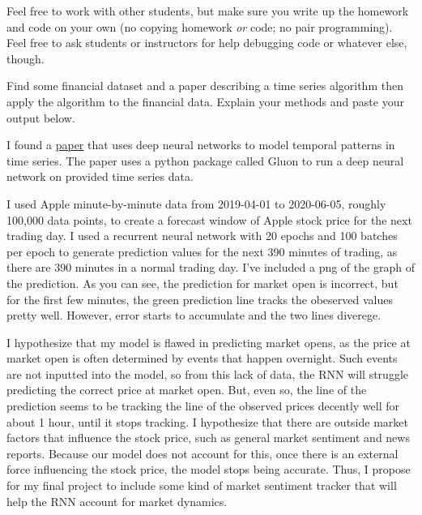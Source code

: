 \documentclass[12pt,letterpaper]{pset}
\begin{document}
Feel free to work with other students, but make sure you write up the homework
and code on your own (no copying homework \textit{or} code; no pair programming).
Feel free to ask students or instructors for help debugging code or whatever else,
though.\\

\begin{problem}[1]
  Find some financial dataset and a paper describing a time series algorithm
  then apply the algorithm to the financial data. Explain your methods and
  paste your output below.
\end{problem}

\begin{solution}
    I found a \href{https://arxiv.org/abs/1703.07015} {paper} that uses deep neural networks to model temporal patterns in time series. The paper uses a python package called Gluon to run a deep neural network on provided time series data.
    
    I used Apple minute-by-minute data from 2019-04-01 to 2020-06-05, roughly 100,000 data points, to create a forecast window of Apple stock price for the next trading day. I used a recurrent neural network with 20 epochs and 100 batches per epoch to generate prediction values for the next 390 minutes of trading, as there are 390 minutes in a normal trading day. I've included a png of the graph of the prediction. As you can see, the prediction for market open is incorrect, but for the first few minutes, the green prediction line tracks the obeserved values pretty well. However, error starts to accumulate and the two lines diverege.
    
    I hypothesize that my model is flawed in predicting market opens, as the price at market open is often determined by events that happen overnight. Such events are not inputted into the model, so from this lack of data, the RNN will struggle predicting the correct price at market open. But, even so, the line of the prediction seems to be tracking the line of the observed prices decently well for about 1 hour, until it stops tracking. I hypothesize that there are outside market factors that influence the stock price, such as general market sentiment and news reports. Because our model does not account for this, once there is an external force influencing the stock price, the model stops being accurate. Thus, I propose for my final project to include some kind of market sentiment tracker that will help the RNN account for market dynamics. 
    
    \end{solution}

\newpage
\end{document}
